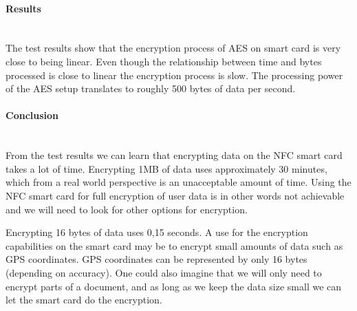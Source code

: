 \paragraph{Results}\mbox{}\\



The test results show that the encryption process of AES on smart card is very close to being linear. Even though the relationship between time and bytes processed is close to linear the encryption process is slow. The processing power of the AES setup translates to roughly 500 bytes of data per second. 


\paragraph{Conclusion}\mbox{}\\
From the test results we can learn that encrypting data on the NFC smart card takes a lot of time. Encrypting 1MB of data uses approximately 30 minutes, which from a real world perspective is an unacceptable amount of time. Using the NFC smart card for full encryption of user data is in other words not achievable and we will need to look for other options for encryption.

Encrypting 16 bytes of data uses 0,15 seconds. A use for the encryption capabilities on the smart card may be to encrypt small amounts of data such as GPS coordinates. GPS coordinates can be represented by only 16 bytes (depending on accuracy). One could also imagine that we will only need to encrypt parts of a document, and as long as we keep the data size small we can let the smart card do the encryption.
